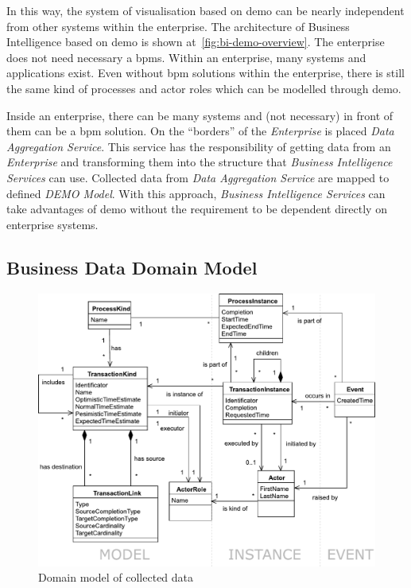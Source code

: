 In this way, the system of visualisation based on \gls{demo} can be nearly independent from other systems within the enterprise. The architecture of Business Intelligence based on \gls{demo} is shown at~\cref{fig:bi-demo-overview}. The enterprise does not need necessary a \gls{bpms}. Within an enterprise, many systems and applications exist. Even without \gls{bpm} solutions within the enterprise, there is still the same kind of processes and actor roles which can be modelled through \gls{demo}.

Inside an enterprise, there can be many systems and (not necessary) in front of them can be a \gls{bpm} solution. On the ``borders'' of the \textit{Enterprise} is placed \textit{Data Aggregation Service}. This service has the responsibility of getting data from an \textit{Enterprise} and transforming them into the structure that \textit{Business Intelligence Services} can use. Collected data from \textit{Data Aggregation Service} are mapped to defined \textit{DEMO Model}.
With this approach, \textit{Business Intelligence Services} can take advantages of \gls{demo} without the requirement to be dependent directly on enterprise systems.
\subsection{Business Data Domain Model}
\begin{figure}[ht!]
  \centering
  \includegraphics[width=13cm,keepaspectratio]{img/domain-data-model}
  \caption{Domain model of collected data}
  \label{fig:domain-data-model}
\end{figure}    

